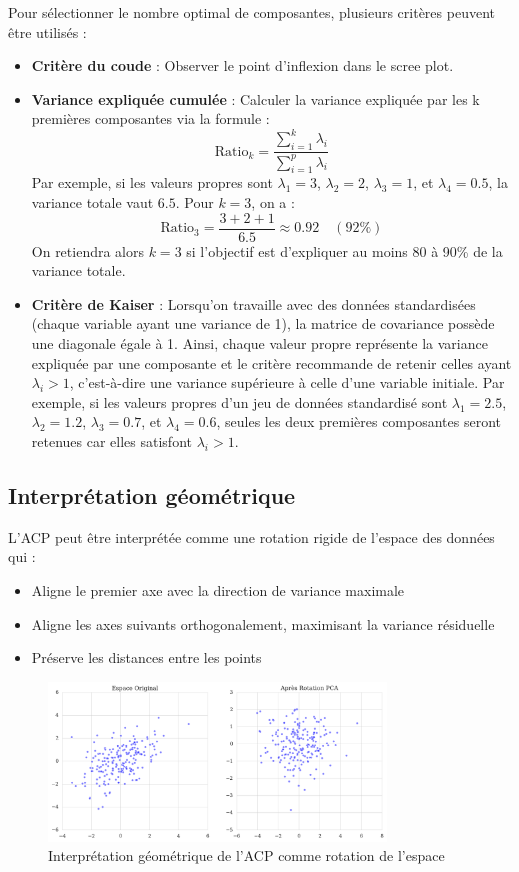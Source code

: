 \documentclass[a4paper,12pt]{report}
\begin{document}
Pour sélectionner le nombre optimal de composantes, plusieurs critères peuvent être utilisés :
\begin{itemize}
    \item \textbf{Critère du coude} : Observer le point d'inflexion dans le scree plot.
    \item \textbf{Variance expliquée cumulée} : 
    Calculer la variance expliquée par les k premières composantes via la formule :
    \[
    \text{Ratio}_k = \frac{\sum_{i=1}^k \lambda_i}{\sum_{i=1}^{p} \lambda_i}
    \]
    Par exemple, si les valeurs propres sont $\lambda_1=3$, $\lambda_2=2$, $\lambda_3=1$, et $\lambda_4=0.5$, la variance totale vaut $6.5$. Pour $k=3$, on a :
    \[
    \text{Ratio}_3 = \frac{3+2+1}{6.5}\approx 0.92 \quad (92\%)
    \]
    On retiendra alors $k=3$ si l'objectif est d'expliquer au moins 80 à 90\% de la variance totale.
    
    \item \textbf{Critère de Kaiser} : 
    Lorsqu'on travaille avec des données standardisées (chaque variable ayant une variance de 1), la matrice de covariance possède une diagonale égale à 1. Ainsi, chaque valeur propre représente la variance expliquée par une composante et le critère recommande de retenir celles ayant $\lambda_i > 1$, c'est-à-dire une variance supérieure à celle d'une variable initiale.
    Par exemple, si les valeurs propres d'un jeu de données standardisé sont $\lambda_1=2.5$, $\lambda_2=1.2$, $\lambda_3=0.7$, et $\lambda_4=0.6$, seules les deux premières composantes seront retenues car elles satisfont $\lambda_i > 1$.
\end{itemize}

\subsection{Interprétation géométrique}

L'ACP peut être interprétée comme une rotation rigide de l'espace des données qui :
\begin{itemize}
    \item Aligne le premier axe avec la direction de variance maximale
    \item Aligne les axes suivants orthogonalement, maximisant la variance résiduelle
    \item Préserve les distances entre les points
\end{itemize}

\begin{figure}[H]
    \centering
    \includegraphics[width=0.8\textwidth]{pca_geometric.png}
    \caption{Interprétation géométrique de l'ACP comme rotation de l'espace}
    \label{fig:pca_geometric}
\end{figure}
\end{document}
